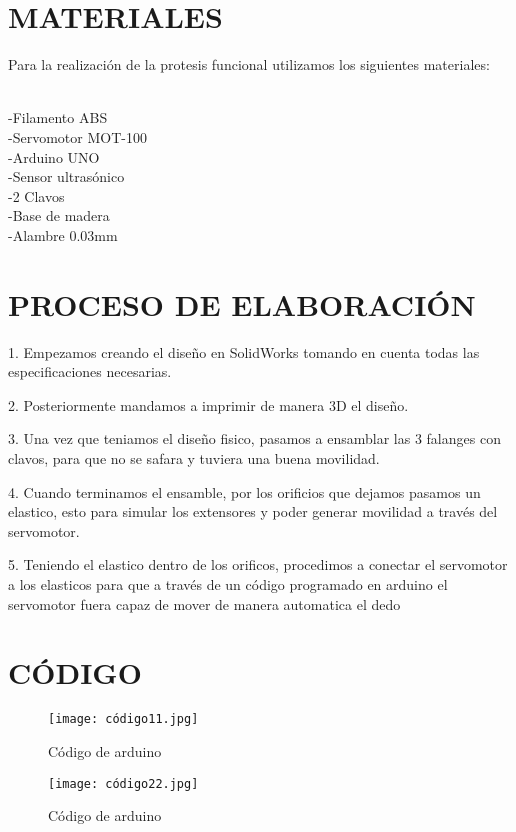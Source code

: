 \documentclass{article}
\begin{document}
\section{MATERIALES}
Para la realización de la protesis funcional utilizamos los siguientes materiales:

\\-Filamento ABS
\\-Servomotor MOT-100
\\-Arduino UNO
\\-Sensor ultrasónico
\\-2 Clavos
\\-Base de madera
\\-Alambre 0.03mm

\newpage

\section{PROCESO DE ELABORACIÓN}

1. Empezamos creando el diseño en SolidWorks tomando en cuenta todas las especificaciones necesarias.

2. Posteriormente mandamos a imprimir de manera 3D el diseño.

3. Una vez que teniamos el diseño fisico, pasamos a ensamblar las 3 falanges con clavos, para que no se safara y tuviera una buena movilidad.

4. Cuando terminamos el ensamble, por los orificios que dejamos pasamos un elastico, esto para simular los extensores y poder generar movilidad a través del servomotor.

5. Teniendo el elastico dentro de los orificos, procedimos a conectar el servomotor a los elasticos para que a través de un código programado en arduino el servomotor fuera capaz de mover de manera automatica el dedo

\section{CÓDIGO}

\begin{figure} [htp]%
    \centering
    \texttt{[image: código11.jpg]} %
    \caption{Código de arduino}
    \label{grafica}
\end{figure}

\begin{figure} [htp]%
    \centering
    \texttt{[image: código22.jpg]} %
    \caption{Código de arduino}
    \label{grafica}
\end{figure}
\end{document}

